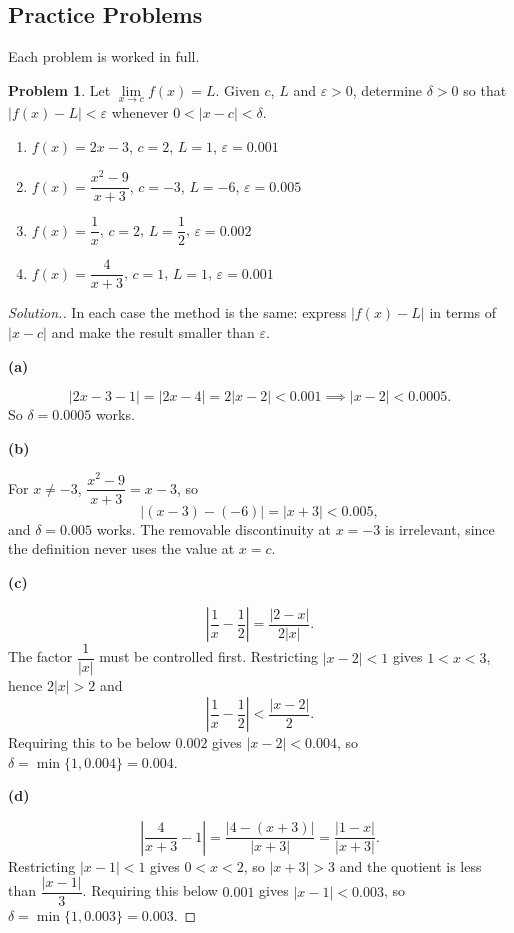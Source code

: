 \documentclass[11pt,a4paper]{article}
\theoremstyle{definition}
\newtheorem{problemx}{Problem}[subsection]
\newenvironment{problem}{\begin{problemx}}{\end{problemx}}
\newenvironment{solution}
  {\renewcommand{\qedsymbol}{}\begin{proof}[\textit{Solution}.]}
  {\end{proof}}
\newcommand{\subhead}[1]{%
  \par\medskip\noindent\textbf{#1}\par\nobreak\smallskip}
\begin{document}
\subsection{Practice Problems}

Each problem is worked in full.

\begin{problem}
Let $\lim\limits_{x\rightarrow c}f(x) = L$. Given $c$, $L$ and $\varepsilon>0$,
determine $\delta>0$ so that $\left|f(x)-L\right|<\varepsilon$ whenever
$0<\left|x-c\right|<\delta$.
\begin{enumerate}
\item[(a)] $f(x) = 2x-3$, $c=2$, $L=1$, $\varepsilon = 0.001$
\item[(b)] $f(x) = \dfrac{x^2-9}{x+3}$, $c=-3$, $L=-6$, $\varepsilon = 0.005$
\item[(c)] $f(x) = \dfrac{1}{x}$, $c=2$, $L=\dfrac12$, $\varepsilon = 0.002$
\item[(d)] $f(x) = \dfrac{4}{x+3}$, $c=1$, $L=1$, $\varepsilon = 0.001$
\end{enumerate}
\end{problem}
\begin{solution}
In each case the method is the same: express $\left|f(x)-L\right|$ in terms of
$\left|x-c\right|$ and make the result smaller than $\varepsilon$.

\subhead{(a)}
$$\left|2x-3-1\right| = \left|2x-4\right| = 2\left|x-2\right| < 0.001
\implies \left|x-2\right| < 0.0005 .$$
So $\delta = 0.0005$ works.

\subhead{(b)}
For $x\neq -3$, $\dfrac{x^2-9}{x+3} = x-3$, so
$$\left|(x-3)-(-6)\right| = \left|x+3\right| < 0.005 ,$$
and $\delta = 0.005$ works. The removable discontinuity at $x=-3$ is irrelevant,
since the definition never uses the value at $x=c$.

\subhead{(c)}
$$\left|\frac{1}{x} - \frac{1}{2}\right| = \frac{\left|2-x\right|}{2\left|x\right|}.$$
The factor $\dfrac{1}{\left|x\right|}$ must be controlled first. Restricting
$\left|x-2\right|<1$ gives $1<x<3$, hence $2\left|x\right|>2$ and
$$\left|\frac{1}{x}-\frac{1}{2}\right| < \frac{\left|x-2\right|}{2} .$$
Requiring this to be below $0.002$ gives $\left|x-2\right|<0.004$, so
$\delta = \min\{1, 0.004\} = 0.004$.

\subhead{(d)}
$$\left|\frac{4}{x+3} - 1\right| = \frac{\left|4 - (x+3)\right|}{\left|x+3\right|}
= \frac{\left|1-x\right|}{\left|x+3\right|}.$$
Restricting $\left|x-1\right|<1$ gives $0<x<2$, so $\left|x+3\right|>3$ and the
quotient is less than $\dfrac{\left|x-1\right|}{3}$. Requiring this below
$0.001$ gives $\left|x-1\right|<0.003$, so $\delta = \min\{1,0.003\} = 0.003$.
\end{solution}
\end{document}
